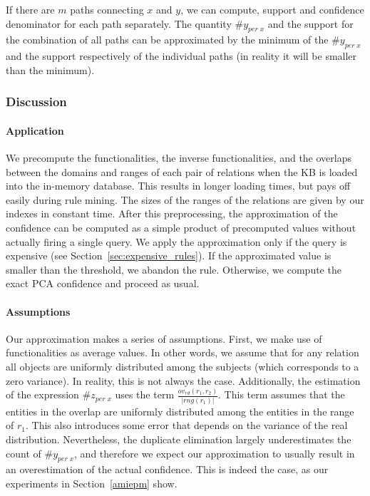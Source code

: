 {If there are $m$ paths connecting $x$ and $y$, we can compute, support and confidence denominator for each path separately.
The quantity $\#y_{per\;x}$ and the support for the combination of all paths can be approximated by the minimum of the $\#y_{per\;x}$ and the support
respectively of the individual paths (in reality it will be smaller than the minimum). 
}

\subsubsection{Discussion}\label{sec:appr_discussion}

\paragraph{Application} We precompute the functionalities,
the inverse functionalities, and the overlaps between the domains and ranges of each pair of relations when the KB is loaded
into the in-memory database. This results in longer loading times, but pays off easily during rule mining. The sizes of the ranges of the relations are given by
our indexes in constant time.
After this preprocessing, the approximation of the confidence can be computed as a simple product of precomputed values without actually firing a single query.
We apply the approximation only if the query is expensive (see Section~\ref{sec:expensive_rules}).
If the approximated value is smaller than the threshold, we abandon the rule.
Otherwise, we compute the exact PCA confidence and proceed as usual.

\paragraph{Assumptions} Our approximation makes a series of assumptions.
First, we make use of functionalities as average values. In other words, we assume that for any relation all objects are uniformly distributed among the subjects (which corresponds to a zero variance).
In reality, this is not always the case. Additionally,
the estimation of the expression $\#z_{per \; x}$ uses the term $\frac{ov_{rd}(r_1,r_2)}{|rng(r_1)|}$.
This term assumes that the entities in the overlap are uniformly distributed among the entities in the range of $r_1$.
This also introduces some error that depends on the variance of the real distribution.
Nevertheless, the duplicate elimination largely underestimates the count of $\#y_{per\;x}$, and therefore we expect our approximation to usually
result in an overestimation of the actual confidence. This is indeed the case, as our experiments in Section~\ref{amiepm} show.


